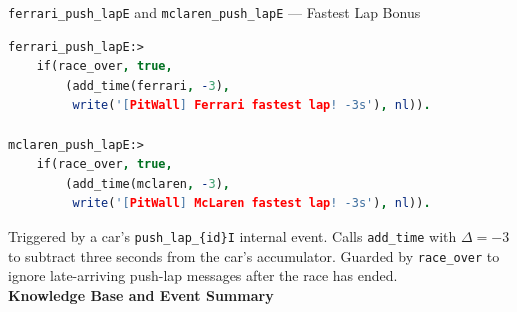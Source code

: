 \begin{minipage}{\linewidth}
\texttt{ferrari\_push\_lapE} and \texttt{mclaren\_push\_lapE} --- Fastest Lap Bonus

\begin{lstlisting}[language=Prolog]
ferrari_push_lapE:>
    if(race_over, true,
        (add_time(ferrari, -3),
         write('[PitWall] Ferrari fastest lap! -3s'), nl)).

mclaren_push_lapE:>
    if(race_over, true,
        (add_time(mclaren, -3),
         write('[PitWall] McLaren fastest lap! -3s'), nl)).
\end{lstlisting}
\end{minipage}

Triggered by a car's \texttt{push\_lap\_\{id\}I} internal event. Calls
\texttt{add\_time} with $\Delta = -3$ to subtract three seconds from the
car's accumulator. Guarded by \texttt{race\_over} to ignore late-arriving
push-lap messages after the race has ended. \\

\textbf{Knowledge Base and Event Summary}

